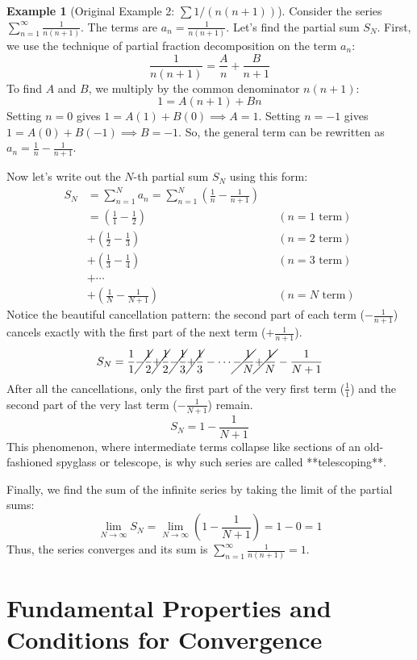 \documentclass[11pt, letterpaper]{article}
\theoremstyle{plain} %
\theoremstyle{definition} %
\newtheorem{example}[theorem]{Example} %
\theoremstyle{remark} %
\begin{document}
\begin{example}[Original Example 2: $\sum 1/(n(n+1))$]
Consider the series $\sum_{n=1}^{\infty} \frac{1}{n(n+1)}$.
The terms are $a_n = \frac{1}{n(n+1)}$. Let's find the partial sum $S_N$.
First, we use the technique of partial fraction decomposition on the term $a_n$:
\[ \frac{1}{n(n+1)} = \frac{A}{n} + \frac{B}{n+1} \]
To find $A$ and $B$, we multiply by the common denominator $n(n+1)$:
\[ 1 = A(n+1) + Bn \]
Setting $n=0$ gives $1 = A(1) + B(0) \implies A=1$.
Setting $n=-1$ gives $1 = A(0) + B(-1) \implies B=-1$.
So, the general term can be rewritten as $a_n = \frac{1}{n} - \frac{1}{n+1}$.

Now let's write out the $N$-th partial sum $S_N$ using this form:
\begin{align*} S_N &= \sum_{n=1}^N a_n = \sum_{n=1}^N \left( \frac{1}{n} - \frac{1}{n+1} \right) \\ &= \left( \frac{1}{1} - \frac{1}{2} \right) && (n=1 \text{ term}) \\ &+ \left( \frac{1}{2} - \frac{1}{3} \right) && (n=2 \text{ term}) \\ &+ \left( \frac{1}{3} - \frac{1}{4} \right) && (n=3 \text{ term}) \\ &+ \dotsb \\ &+ \left( \frac{1}{N} - \frac{1}{N+1} \right) && (n=N \text{ term}) \end{align*}
Notice the beautiful cancellation pattern: the second part of each term ($-\frac{1}{n+1}$) cancels exactly with the first part of the next term ($+\frac{1}{n+1}$).
\[ S_N = \frac{1}{1} \cancel{- \frac{1}{2}} \cancel{+ \frac{1}{2}} \cancel{- \frac{1}{3}} \cancel{+ \frac{1}{3}} - \dotsb \cancel{- \frac{1}{N}} \cancel{+ \frac{1}{N}} - \frac{1}{N+1} \]
After all the cancellations, only the first part of the very first term ($\frac{1}{1}$) and the second part of the very last term ($-\frac{1}{N+1}$) remain.
\[ S_N = 1 - \frac{1}{N+1} \]
This phenomenon, where intermediate terms collapse like sections of an old-fashioned spyglass or telescope, is why such series are called **telescoping**.

Finally, we find the sum of the infinite series by taking the limit of the partial sums:
\[ \lim_{N \to \infty} S_N = \lim_{N \to \infty} \left( 1 - \frac{1}{N+1} \right) = 1 - 0 = 1 \]
Thus, the series converges and its sum is $\sum_{n=1}^{\infty} \frac{1}{n(n+1)} = 1$.
\end{example}

\section{Fundamental Properties and Conditions for Convergence}
\end{document}
